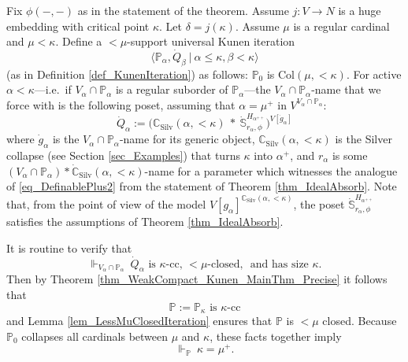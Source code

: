 \documentclass{amsart}
\begin{document}
Fix $\phi(-,-)$ as in the statement of the theorem.  Assume $j: V \to N$ is a huge embedding with critical point $\kappa$.  Let $\delta = j(\kappa)$.  Assume $\mu$ is a regular cardinal and $\mu < \kappa$.  Define a $<\mu$-support universal Kunen iteration  
\[
\langle \mathbb{P}_\alpha, \dot{Q}_\beta \ | \ \alpha \le \kappa, \beta < \kappa \rangle
\]
(as in Definition \ref{def_KunenIteration}) as follows:  $\mathbb{P}_0$ is $\text{Col}(\mu, < \kappa)$.  For active $\alpha < \kappa$---i.e.\ if $V_\alpha \cap \mathbb{P}_\alpha$ is a regular suborder of $\mathbb{P}_\alpha$---the $V_\alpha \cap \mathbb{P}_\alpha$-name that we force with is the following poset, assuming that $\alpha = \mu^+$ in $V^{V_\alpha \cap \mathbb{P}_\alpha}$:
\[
\dot{Q}_\alpha:= \Big( \mathbb{C}_{\text{Silv}}(\alpha, < \kappa) \ * \  \dot{\mathbb{S}}^{H_{\alpha^{++}}}_{r_\alpha,\phi}  \Big)^{V[\dot{g}_\alpha]}
\]
where $\dot{g}_\alpha$ is the $V_\alpha \cap \mathbb{P}_\alpha$-name for its generic object, $\mathbb{C}_{\text{Silv}}(\alpha, < \kappa)$ is the Silver collapse (see Section \ref{sec_Examples}) that turns $\kappa$ into $\alpha^+$, and $r_\alpha$ is some $(V_\alpha \cap \mathbb{P}_\alpha)*\dot{\mathbb{C}}_{\text{Silv}}(\alpha, < \kappa)$-name for a parameter which witnesses the analogue of \eqref{eq_DefinablePlus2} from the statement of Theorem \ref{thm_IdealAbsorb}.  Note that, from the point of view of the model $V[g_\alpha]^{\mathbb{C}_{\text{Silv}}(\alpha, < \kappa)}$, the poset $\dot{\mathbb{S}}^{H_{\alpha^{++}}}_{r_\alpha,\phi}$ satisfies the assumptions of Theorem \ref{thm_IdealAbsorb}.


It is routine to verify that  
\begin{equation*}
\Vdash_{V_\alpha \cap \mathbb{P}_\alpha} \ \dot{Q}_\alpha \text{ is } \kappa \text{-cc} \text{, } <\mu \text{-closed, } \text{ and has size } \kappa.
\end{equation*}
Then by Theorem \ref{thm_WeakCompact_Kunen_MainThm_Precise} it follows that
\begin{equation}\label{eq_P_is_KappaCC}
\mathbb{P}:= \mathbb{P}_\kappa \text{ is } \kappa \text{-cc}
\end{equation} 
and Lemma \ref{lem_LessMuClosedIteration} ensures that $\mathbb{P}$ is $<\mu$ closed.  Because $\mathbb{P}_0$ collapses all cardinals between $\mu$ and $\kappa$, these facts together imply
\begin{equation}\label{eq_KappaBecomesMuPlus}
\Vdash_{\mathbb{P}} \ \kappa = \mu^+.
\end{equation}
\end{document}
